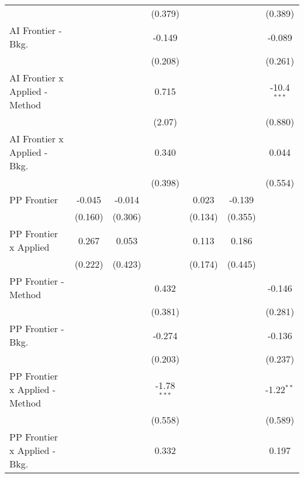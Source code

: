 \begin{tabular}{lcccccc}
                                  &         &         & (0.379)       &              &         & (0.389)\\   
   AI Frontier - Bkg.             &         &         & -0.149        &              &         & -0.089\\   
                                  &         &         & (0.208)       &              &         & (0.261)\\   
   AI Frontier x Applied - Method &         &         & 0.715         &              &         & -10.4$^{***}$\\   
                                  &         &         & (2.07)        &              &         & (0.880)\\   
   AI Frontier x Applied - Bkg.   &         &         & 0.340         &              &         & 0.044\\   
                                  &         &         & (0.398)       &              &         & (0.554)\\   
   PP Frontier                    & -0.045  & -0.014  &               & 0.023        & -0.139  &   \\   
                                  & (0.160) & (0.306) &               & (0.134)      & (0.355) &   \\   
   PP Frontier x Applied          & 0.267   & 0.053   &               & 0.113        & 0.186   &   \\   
                                  & (0.222) & (0.423) &               & (0.174)      & (0.445) &   \\   
   PP Frontier - Method           &         &         & 0.432         &              &         & -0.146\\   
                                  &         &         & (0.381)       &              &         & (0.281)\\   
   PP Frontier - Bkg.             &         &         & -0.274        &              &         & -0.136\\   
                                  &         &         & (0.203)       &              &         & (0.237)\\   
   PP Frontier x Applied - Method &         &         & -1.78$^{***}$ &              &         & -1.22$^{**}$\\   
                                  &         &         & (0.558)       &              &         & (0.589)\\   
   PP Frontier x Applied - Bkg.   &         &         & 0.332         &              &         & 0.197\\   

\end{tabular}
